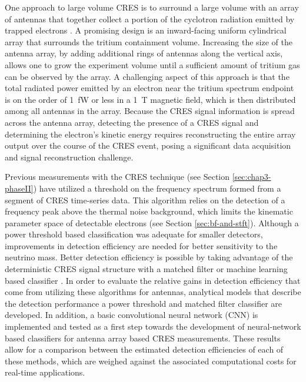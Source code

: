 One approach to large volume CRES is to surround a large volume with an array of antennas that together collect a portion of the cyclotron radiation emitted by trapped electrons \cite{p8snowmass2022, p8PanicProc}. A promising design is an inward-facing uniform cylindrical array that surrounds the tritium containment volume. Increasing the size of the antenna array, by adding additional rings of antennas along the vertical axis, allows one to grow the experiment volume until a sufficient amount of tritium gas can be observed by the array. A challenging aspect of this approach is that the total radiated power emitted by an electron near the tritium spectrum endpoint is on the order of 1~fW or less in a 1~T magnetic field, which is then distributed among all antennas in the array. Because the CRES signal information is spread across the antenna array, detecting the presence of a CRES signal and determining the electron's kinetic energy requires reconstructing the entire array output over the course of the CRES event, posing a significant data acquisition and signal reconstruction challenge.%

Previous measurements with the CRES technique (see Section \ref{sec:chap3-phaseII}) have utilized a threshold on the frequency spectrum formed from a segment of CRES time-series data. This algorithm relies on the detection of a frequency peak above the thermal noise background, which limits the kinematic parameter space of detectable electrons (see Section \ref{sec:bf-and-stft}). Although a power threshold based classification was adequate for smaller detectors, improvements in detection efficiency are needed for better sensitivity to the neutrino mass. Better detection efficiency is possible by taking advantage of the deterministic CRES signal structure with a matched filter or machine learning based classifier \cite{p8ml_1}. In order to evaluate the relative gains in detection efficiency that come from utilizing these algorithms for antennas, analytical models that describe the detection performance a power threshold and matched filter classifier are developed. In addition, a basic convolutional neural network (CNN) is implemented and tested as a first step towards the development of neural-network based classifiers for antenna array based CRES measurements. These results allow for a comparison between the estimated detection efficiencies of each of these methods, which are weighed against the associated computational costs for real-time applications.

